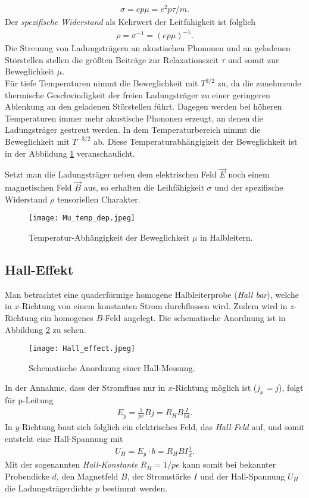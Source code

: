 \begin{align}
\sigma=ep\mu=e^2p\tau/m.
\end{align}
Der \emph{spezifische Widerstand} als Kehrwert der Leitfähigkeit ist folglich
\begin{align}
\rho=\sigma^{-1}=(ep\mu)^{-1}.
\end{align}
Die Streuung von Ladungsträgern an akustischen Phononen und an geladenen Störstellen stellen die größten Beiträge zur Relaxationszeit $\tau$ und somit   zur Beweglichkeit $\mu$.\\
Für tiefe Temperaturen nimmt die Beweglichkeit mit $T^{3/2}$ zu, da die zunehmende thermische Geschwindigkeit der freien Ladungsträger zu einer geringeren Ablenkung an den geladenen Störstellen führt. Dagegen werden bei höheren Temperaturen immer mehr akustische Phononen erzeugt, an denen die Ladungsträger gestreut werden. In dem Temperaturbereich nimmt die Beweglichkeit mit $T^{-3/2}$ ab. Diese Temperaturabhängigkeit der Beweglichkeit ist in der Abbildung \ref{fig:mu-temp_dep} veranschaulicht.

Setzt man die Ladungsträger neben dem elektrischen Feld $\vec{E}$ noch einem magnetischen Feld $\vec{B}$ aus, so erhalten die Leihfähigkeit $\sigma$ und der spezifische Widerstand $\rho$ tensoriellen Charakter.
\enlargethispage{3em}
\begin{figure}[h!]
\centering
\texttt{[image: Mu\_temp\_dep.jpeg]}
\caption{Temperatur-Abhängigkeit der Beweglichkeit $\mu$ in Halbleitern. \cite{lit:GroMa14}}
\label{fig:mu-temp_dep}
\end{figure}

\newpage
\subsection{Hall-Effekt}
Man betrachtet eine quaderförmige homogene Halbleiterprobe (\emph{Hall bar}), welche in $x$-Richtung von einem konstanten Strom durchflossen wird. Zudem wird in $z$-Richtung ein homogenes $B$-Feld angelegt. Die schematische Anordnung ist in Abbildung \ref{fig:hall-effect} zu sehen.
\begin{figure}[h]
\centering
\texttt{[image: Hall\_effect.jpeg]}
\caption{Schematische Anordnung einer Hall-Messung. \cite{lit:Iba09}}
\label{fig:hall-effect}
\end{figure}

In der Annahme, dass der Stromfluss nur in $x$-Richtung möglich ist ($j_x=j$), folgt für p-Leitung
\begin{align}
E_y=\frac{1}{pe}Bj=R_H B\frac{I}{bd}.
\end{align}
In $y$-Richtung baut sich folglich ein elektrisches Feld, das \emph{Hall-Feld} auf, und somit entsteht eine Hall-Spannung mit
\begin{align}
U_H=E_y\cdot b=R_H B I\frac{1}{d}.
\end{align}
Mit der sogenannten \emph{Hall-Konstante} $R_H=1/pe$ kann somit bei bekannter Probendicke $d$, den Magnetfeld $B$, der Stromstärke $I$ und der Hall-Spannung $U_H$ die Ladungsträgerdichte $p$ bestimmt werden.

